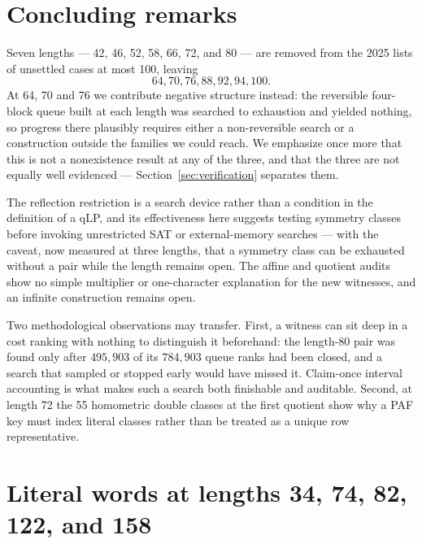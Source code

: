\documentclass[11pt]{article}
\begin{document}
\section{Concluding remarks}

Seven lengths --- 42, 46, 52, 58, 66, 72, and 80 --- are removed from the 2025
lists of unsettled cases at most 100, leaving
\[
  64,70,76,88,92,94,100.
\]
At 64, 70 and 76 we contribute negative structure instead: the reversible
four-block queue built at each length was searched to exhaustion and yielded
nothing, so progress there plausibly requires either a non-reversible search or
a construction outside the families we could reach.  We emphasize once more
that this is not a nonexistence result at any of the three, and that the three
are not equally well evidenced --- Section~\ref{sec:verification} separates
them.

The reflection restriction is a search device rather than a condition in the
definition of a qLP, and its effectiveness here suggests testing symmetry
classes before invoking unrestricted SAT or external-memory searches --- with
the caveat, now measured at three lengths, that a symmetry class can be
exhausted
without a pair while the length remains open.  The affine and quotient audits
show no simple multiplier or one-character explanation for the new witnesses,
and an infinite construction remains open.

Two methodological observations may transfer.  First, a witness can sit deep in
a cost ranking with nothing to distinguish it beforehand: the length-80 pair
was found only after $495{,}903$ of its $784{,}903$ queue ranks had been
closed, and a search that sampled or stopped early would have missed it.
Claim-once interval accounting is what makes such a search both finishable and
auditable.  Second, at length 72 the 55 homometric double classes at the first
quotient show why a PAF key must index literal classes rather than be treated
as a unique row representative.

\appendix

\section{Literal words at lengths 34, 74, 82, 122, and 158}
\label{app:known}
\end{document}
